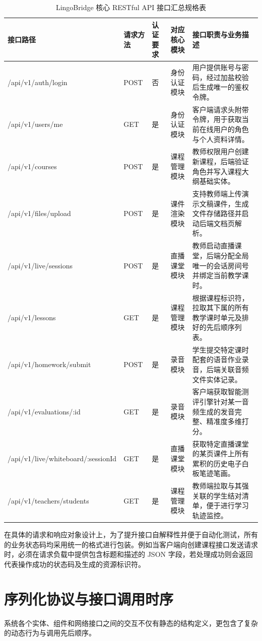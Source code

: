 \begin{longtable}{@{}p{3.8cm} p{1.6cm} p{1.6cm} p{2.2cm} p{5.5cm}@{}}
\caption{LingoBridge 核心 RESTful API 接口汇总规格表} \label{tab:api-specs} \\
\toprule
接口路径 & 请求方法 & 认证要求 & 对应核心模块 & 接口职责与业务描述 \\
\midrule
\endhead
\bottomrule
\endfoot
/api/v1/auth/login & POST & 否 & 身份认证模块 & 用户提供账号与密码，经过加盐校验后生成唯一的鉴权令牌。 \\
/api/v1/users/me & GET & 是 & 身份认证模块 & 客户端请求头附带令牌，用于获取当前在线用户的角色与个人资料详情。 \\
/api/v1/courses & POST & 是 & 课程管理模块 & 教师权限用户创建新课程，后端验证角色并写入课程大纲基础实体。 \\
/api/v1/files/upload & POST & 是 & 课件渲染模块 & 支持教师端上传演示文稿课件，生成文件存储路径并启动后端文档页解析。 \\
/api/v1/live/sessions & POST & 是 & 直播课堂模块 & 教师启动直播课堂，后端分配全局唯一的会话房间号并绑定当前教学课时。 \\
/api/v1/lessons & GET & 是 & 课程管理模块 & 根据课程标识符，拉取其下属的所有教学课时单元及排好的先后顺序列表。 \\
/api/v1/homework/submit & POST & 是 & 录音模块 & 学生提交特定课时配套的语音作业录音，后端关联音频文件实体记录。 \\
/api/v1/evaluations/:id & GET & 是 & 录音模块 & 客户端获取智能测评引擎针对某一音频生成的发音完整、精准度多维打分。 \\
/api/v1/live/\allowbreak whiteboard/\allowbreak :sessionId & GET & 是 & 直播课堂模块 & 获取特定直播课堂的某页课件上所有累积的历史电子白板笔迹笔画。 \\
/api/v1/teachers/students & GET & 是 & 课程管理模块 & 教师端拉取与其强关联的学生结对清单，便于进行学习轨迹监控。 \\
\bottomrule
\end{longtable}

在具体的请求和响应对象设计上，为了提升接口自解释性并便于自动化测试，所有的业务状态码均采用统一的格式进行包装。例如当客户端向创建课程接口发送请求时，必须在请求负载中提供包含标题和描述的 JSON 字段，若处理成功则会返回代表操作成功的状态码及生成的资源标识符。

\section{序列化协议与接口调用时序}
系统各个实体、组件和网络接口之间的交互不仅有静态的结构定义，更包含了复杂的动态行为与调用先后顺序。

